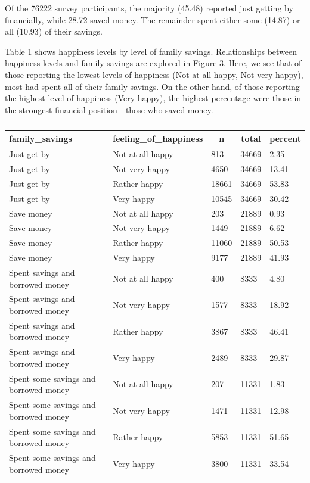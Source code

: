 \documentclass[man, fleqn, noextraspace,floatsintext]{apa6}
\begin{document}
Of the 76222 survey participants, the majority (45.48) reported just
getting by financially, while 28.72 saved money. The remainder spent
either some (14.87) or all (10.93) of their savings.

Table 1 shows happiness levels by level of family savings. Relationships
between happiness levels and family savings are explored in Figure 3.
Here, we see that of those reporting the lowest levels of happiness (Not
at all happy, Not very happy), most had spent all of their family
savings. On the other hand, of those reporting the highest level of
happiness (Very happy), the highest percentage were those in the
strongest financial position - those who saved money.

\begin{table}[tbp]
\begin{center}
\begin{threeparttable}
\caption{\label{tab:happiness by family APA table}}
\begin{tabular}{lllll}
\toprule
family\_savings & \multicolumn{1}{c}{feeling\_of\_happiness} & \multicolumn{1}{c}{n} & \multicolumn{1}{c}{total} & \multicolumn{1}{c}{percent}\\
\midrule
Just get by & Not at all happy & 813 & 34669 & 2.35\\
Just get by & Not very happy & 4650 & 34669 & 13.41\\
Just get by & Rather happy & 18661 & 34669 & 53.83\\
Just get by & Very happy & 10545 & 34669 & 30.42\\
Save money & Not at all happy & 203 & 21889 & 0.93\\
Save money & Not very happy & 1449 & 21889 & 6.62\\
Save money & Rather happy & 11060 & 21889 & 50.53\\
Save money & Very happy & 9177 & 21889 & 41.93\\
Spent savings and borrowed money & Not at all happy & 400 & 8333 & 4.80\\
Spent savings and borrowed money & Not very happy & 1577 & 8333 & 18.92\\
Spent savings and borrowed money & Rather happy & 3867 & 8333 & 46.41\\
Spent savings and borrowed money & Very happy & 2489 & 8333 & 29.87\\
Spent some savings and borrowed money & Not at all happy & 207 & 11331 & 1.83\\
Spent some savings and borrowed money & Not very happy & 1471 & 11331 & 12.98\\
Spent some savings and borrowed money & Rather happy & 5853 & 11331 & 51.65\\
Spent some savings and borrowed money & Very happy & 3800 & 11331 & 33.54\\
\bottomrule
\end{tabular}
\end{threeparttable}
\end{center}
\end{table}
\end{document}
